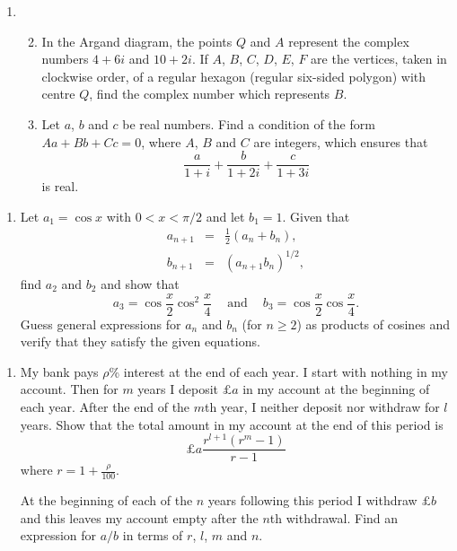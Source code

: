 \documentclass[a4, 11pt]{report}
\newlength{\qspace}
\newcounter{qnumber}
\newenvironment{question}%
 {\vspace{\qspace}
  \begin{enumerate}[\bfseries 1\quad][10]%
    \setcounter{enumi}{\value{qnumber}}%
    \item%
 }
{
  \end{enumerate}
  \filbreak
  \stepcounter{qnumber}
 }
\newenvironment{questionparts}[1][1]%
 {
  \begin{enumerate}[\bfseries (i)]%
    \setcounter{enumii}{#1}
    \addtocounter{enumii}{-1}
    \setlength{\itemsep}{5mm}
    \setlength{\parskip}{8pt}
 }
 {
  \end{enumerate}
 }
\def\ge{\geqslant}
\begin{document}
\begin{question}
\begin{questionparts}
\item In the Argand diagram, the points $Q$ and
$A$ represent the complex numbers $4+6i$ and
$10+2i$. If $A$, $B$, $C$, $D$, $E$, $F$
are the vertices, taken in clockwise order, of 
a regular hexagon (regular six-sided polygon)
with centre $Q$, find the complex number which
represents $B$.

\item Let $a$, $b$ and $c$ be real numbers. Find a condition 
of the form $Aa+Bb+Cc=0$,
where $A$, $B$ and $C$ are integers,  which ensures that
\[\frac{a}{1+i}+\frac{b}{1+2i}+\frac{c}{1+3i}\]
is real. 
\end{questionparts}

	\end{question}
	
\begin{question}
Let $a_{1}=\cos x$ with $0<x<\pi/2$
and let $b_{1}=1$. Given that
\begin{eqnarray*}
a_{n+1}&=&{\textstyle \frac{1}{2}}(a_{n}+b_{n}),\\[2mm]
b_{n+1}&=&(a_{n+1}b_{n})^{1/2},
\end{eqnarray*}
find $a_{2}$ and $b_{2}$ and show that
\[a_{3}=\cos\frac{x}{2}\cos^{2}\frac{x}{4}
\ \quad\mbox{and}\quad
\ b_{3}=\cos\frac{x}{2}\cos\frac{x}{4}.\] 
Guess general expressions for $a_{n}$ and $b_{n}$ (for $n\ge2$)
as products of cosines
and verify that they satisfy the given equations.
\end{question}
	
\begin{question}
My bank pays $\rho$\% interest at the end of
each year. I start with nothing in my account.
Then for $m$ years I deposit $\pounds a$
in my  account at the beginning of each year. After the end of the $m$th year, 
I neither deposit nor withdraw for $l$ years.
Show that the total amount in my account at the end
of this period is
\[\pounds a\frac{r^{l+1}(r^{m}-1)}{r-1}\]
where $r=1+{\displaystyle \frac{\rho}{100}}$.

At the beginning of each
of the  $n$ years following this period I withdraw $\pounds b$
and this leaves my account empty after the $n$th withdrawal.
Find an expression for $a/b$ in terms of $r$, $l$, $m$ and $n$.

\end{question}
		
\end{document}
